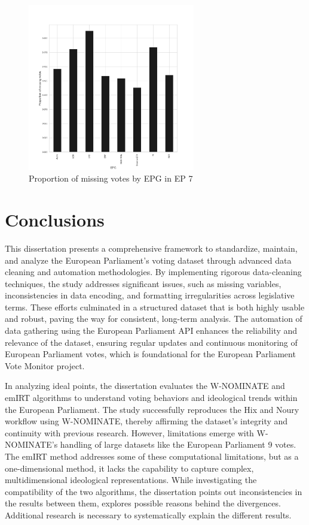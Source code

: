 \documentclass[a4paper,12pt]{report}
\begin{document}
            \begin{figure}[htb]
                \centering
                \includegraphics[width=0.65\textwidth]{Graphs/proportions_report}
                \caption{Proportion of missing votes by EPG in EP 7}
                \label{fig:proportions}
            \end{figure}

    \chapter{Conclusions}\label{ch:conclusions}

        This dissertation presents a comprehensive framework to standardize, maintain, and analyze the European
        Parliament’s voting dataset through advanced data cleaning and automation methodologies. By implementing
        rigorous data-cleaning techniques, the study addresses significant issues, such as missing variables,
        inconsistencies in data encoding, and formatting irregularities across legislative terms. These efforts
        culminated in a structured dataset that is both highly usable and robust, paving the way for consistent,
        long-term analysis. The automation of data gathering using the European Parliament API enhances the reliability
        and relevance of the dataset, ensuring regular updates and continuous monitoring of European Parliament votes,
        which is foundational for the European Parliament Vote Monitor project.

        In analyzing ideal points, the dissertation evaluates the W-NOMINATE and emIRT algorithms to understand voting
        behaviors and ideological trends within the European Parliament. The study successfully reproduces the Hix and
        Noury workflow using W-NOMINATE, thereby affirming the dataset’s integrity and continuity with previous
        research. However, limitations emerge with W-NOMINATE’s handling of large datasets like the European Parliament
        9 votes. The emIRT method addresses some of
        these computational limitations, but as a one-dimensional method, it lacks the capability to capture complex,
        multidimensional ideological representations. While investigating the compatibility of the two algorithms,
        the dissertation points out inconsistencies in the results between them, explores possible reasons behind
        the divergences. Additional research is necessary to systematically explain the different results.
\end{document}
